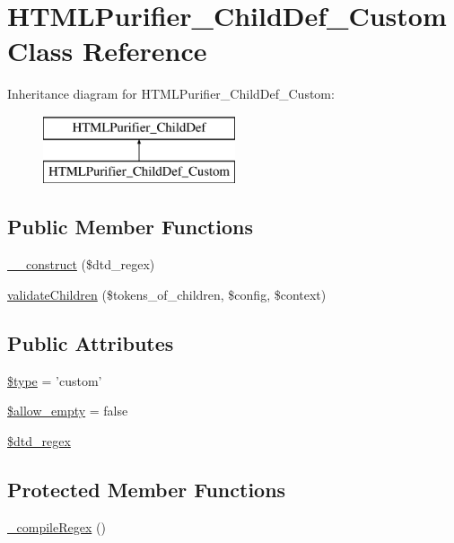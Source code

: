 \hypertarget{classHTMLPurifier__ChildDef__Custom}{\section{H\+T\+M\+L\+Purifier\+\_\+\+Child\+Def\+\_\+\+Custom Class Reference}
\label{classHTMLPurifier__ChildDef__Custom}
}
Inheritance diagram for H\+T\+M\+L\+Purifier\+\_\+\+Child\+Def\+\_\+\+Custom\+:\begin{figure}[H]
\begin{center}
\leavevmode
\includegraphics[height=2.000000cm]{classHTMLPurifier__ChildDef__Custom}
\end{center}
\end{figure}
\subsection*{Public Member Functions}
\begin{DoxyCompactItemize}
\item 
\hyperlink{classHTMLPurifier__ChildDef__Custom_a80ca547f853bf9c2f0dd201b904cc3d4}{\+\_\+\+\_\+construct} (\$dtd\+\_\+regex)
\item 
\hyperlink{classHTMLPurifier__ChildDef__Custom_adf4fc5ab95054b2847ee51ef33f69143}{validate\+Children} (\$tokens\+\_\+of\+\_\+children, \$config, \$context)
\end{DoxyCompactItemize}
\subsection*{Public Attributes}
\begin{DoxyCompactItemize}
\item 
\hyperlink{classHTMLPurifier__ChildDef__Custom_aa367d716379195c16bb9174a7c8b8dde}{\$type} = 'custom'
\item 
\hyperlink{classHTMLPurifier__ChildDef__Custom_acac362eee284fbd3acf67d15bc2acdd9}{\$allow\+\_\+empty} = false
\item 
\hyperlink{classHTMLPurifier__ChildDef__Custom_a72b76ac39dbaa12629440dd7c0dfacf8}{\$dtd\+\_\+regex}
\end{DoxyCompactItemize}
\subsection*{Protected Member Functions}
\begin{DoxyCompactItemize}
\item 
\hyperlink{classHTMLPurifier__ChildDef__Custom_a6870520037ff15a8a2616a6d22a47cce}{\+\_\+compile\+Regex} ()
\end{DoxyCompactItemize}


